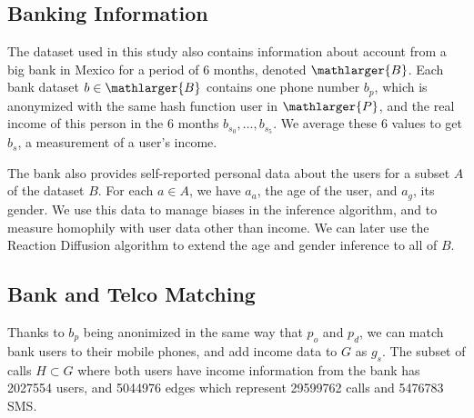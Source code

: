 \subsection{Banking Information}

The dataset used in this study also contains information about account from a big bank in Mexico for a period of 6 months, denoted \( \mathlarger{B} \). Each bank dataset \( b \in \mathlarger{B} \) contains one phone number \( b_p \), which is anonymized with the same hash function user in \( \mathlarger{P} \), and the real income of this person in the 6 months \( b_{s_0}, \ldots, b_{s_5} \). We average these 6 values to get \( b_s \), a measurement of a user's income.

The bank also provides self-reported personal data about the users for a subset \( A \) of the dataset \( B \). For each \( a \in A \), we have \( a_a \), the age of the user, and \( a_g \), its gender. We use this data to manage biases in the inference algorithm, and to measure homophily with user data other than income. We can later use the Reaction Diffusion algorithm \cite{brea2014} to extend the age and gender inference to all of \( B \).

\subsection{Bank and Telco Matching}

Thanks to \( b_p \) being anonimized in the same way that \( p_o \) and \( p_d \), we can match bank users to their mobile phones, and add income data to \( G \) as \( g_s \). The subset of calls \( H \subset G \) where both users have income information from the bank has \num{2027554} users, and \num{5044976} edges which represent \num{29599762} calls and \num{5476783} SMS.
